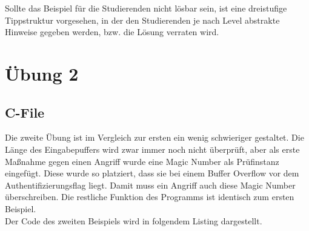 Sollte das Beispiel für die Studierenden nicht lösbar sein, ist eine dreistufige Tippstruktur vorgesehen, in der den Studierenden je nach Level abstrakte Hinweise gegeben werden, bzw. die Lösung verraten wird.


\section{Übung 2}
\subsection{C-File}
Die zweite Übung ist im Vergleich zur ersten ein wenig schwieriger gestaltet. Die Länge des Eingabepuffers wird zwar immer noch nicht überprüft, aber als erste Maßnahme gegen einen Angriff wurde eine Magic Number als Prüfinstanz eingefügt. Diese wurde so platziert, dass sie bei einem Buffer Overflow vor dem Authentifizierungsflag liegt. Damit muss ein Angriff auch diese Magic Number überschreiben. Die restliche Funktion des Programms ist identisch zum ersten Beispiel. \\
Der Code des zweiten Beispiels wird in folgendem Listing dargestellt.

